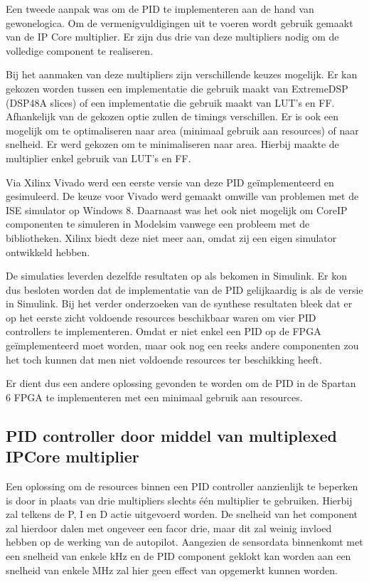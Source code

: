 			\par Een tweede aanpak was om de PID te implementeren aan de hand van \textquotesingle gewone\textquotesingle  logica. Om de vermenigvuldigingen uit te voeren wordt gebruik gemaakt van de IP Core multiplier. Er zijn dus drie van deze multipliers nodig om de volledige component te realiseren. 

			\par Bij het aanmaken van deze multipliers zijn verschillende keuzes mogelijk. Er kan gekozen worden tussen een implementatie die gebruik maakt van ExtremeDSP (DSP48A slices) of een implementatie die gebruik maakt van LUT's en FF. Afhankelijk van de gekozen optie zullen de timings verschillen. Er is ook een mogelijk om te optimaliseren naar area (minimaal gebruik aan resources) of naar snelheid. Er werd gekozen om te minimaliseren naar area. Hierbij maakte de multiplier enkel gebruik van LUT's en FF. 

			\par Via Xilinx Vivado werd een eerste versie van deze PID ge\"implementeerd en gesimuleerd. De keuze voor Vivado werd gemaakt omwille van problemen met de ISE simulator op Windows 8. Daarnaast was het ook niet mogelijk om CoreIP componenten te simuleren in Modelsim vanwege een probleem met de bibliotheken. Xilinx biedt deze niet meer aan, omdat zij een eigen simulator ontwikkeld hebben.

			\par De simulaties leverden dezelfde resultaten op als bekomen in Simulink. Er kon dus besloten worden dat de implementatie van de PID gelijkaardig is als de versie in Simulink. Bij het verder onderzoeken van de synthese resultaten bleek dat er op het eerste zicht voldoende resources beschikbaar waren om vier PID controllers te implementeren. Omdat er niet enkel een PID op de FPGA ge\"implementeerd moet worden, maar ook nog een reeks andere componenten zou het toch kunnen dat men niet voldoende resources ter beschikking heeft.

			\par  Er dient dus een andere oplossing gevonden te worden om de PID in de Spartan 6 FPGA te implementeren met een minimaal gebruik aan resources.

		\subsection{PID controller door middel van multiplexed IPCore multiplier}			

			\par Een oplossing om de resources binnen een PID controller aanzienlijk te beperken is door in plaats van drie multipliers slechts \'e\'en multiplier te gebruiken. Hierbij zal telkens de P, I en D actie uitgevoerd worden. De snelheid van het component zal hierdoor dalen met ongeveer een facor drie, maar dit zal weinig invloed hebben op de werking van de autopilot. Aangezien de sensordata binnenkomt met een snelheid van enkele kHz en de PID component geklokt kan worden aan een snelheid van enkele MHz zal hier geen effect van opgemerkt kunnen worden.

